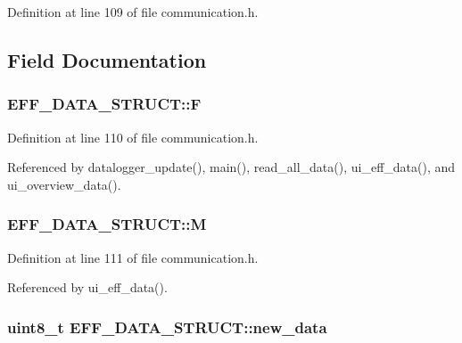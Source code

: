 Definition at line 109 of file communication.\-h.



\subsection{Field Documentation}
\hypertarget{structEFF__DATA__STRUCT_abe8952947b54bf9c247f3429ee3aeb44}{
\subsubsection[{F}]{ E\-F\-F\-\_\-\-D\-A\-T\-A\-\_\-\-S\-T\-R\-U\-C\-T\-::\-F}}\label{structEFF__DATA__STRUCT_abe8952947b54bf9c247f3429ee3aeb44}


Definition at line 110 of file communication.\-h.



Referenced by datalogger\-\_\-update(), main(), read\-\_\-all\-\_\-data(), ui\-\_\-eff\-\_\-data(), and ui\-\_\-overview\-\_\-data().

\hypertarget{structEFF__DATA__STRUCT_aaf6e03b6e600295e0f5c706fc869e9d1}{
\subsubsection[{M}]{ E\-F\-F\-\_\-\-D\-A\-T\-A\-\_\-\-S\-T\-R\-U\-C\-T\-::\-M}}\label{structEFF__DATA__STRUCT_aaf6e03b6e600295e0f5c706fc869e9d1}


Definition at line 111 of file communication.\-h.



Referenced by ui\-\_\-eff\-\_\-data().

\hypertarget{structEFF__DATA__STRUCT_aa42ebc512dd79fa6ebf998162a149446}{
\subsubsection[{new\-\_\-data}]{\setlength{\rightskip}{0pt plus 5cm}uint8\-\_\-t E\-F\-F\-\_\-\-D\-A\-T\-A\-\_\-\-S\-T\-R\-U\-C\-T\-::new\-\_\-data}}\label{structEFF__DATA__STRUCT_aa42ebc512dd79fa6ebf998162a149446}



